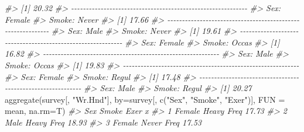 \documentclass[
]{book}
\newenvironment{Shaded}{\begin{snugshade}}{\end{snugshade}}
\newcommand{\AttributeTok}[1]{\textcolor[rgb]{0.77,0.63,0.00}{#1}}
\newcommand{\CommentTok}[1]{\textcolor[rgb]{0.56,0.35,0.01}{\textit{#1}}}
\newcommand{\FunctionTok}[1]{\textcolor[rgb]{0.00,0.00,0.00}{#1}}
\newcommand{\NormalTok}[1]{#1}
\newcommand{\StringTok}[1]{\textcolor[rgb]{0.31,0.60,0.02}{#1}}
\begin{document}
\begin{Shaded}
\begin{Highlighting}[]
\CommentTok{\#\textgreater{} [1] 20.32}
\CommentTok{\#\textgreater{} {-}{-}{-}{-}{-}{-}{-}{-}{-}{-}{-}{-}{-}{-}{-}{-}{-}{-}{-}{-}{-}{-}{-}{-}{-}{-}{-}{-}{-}{-}{-}{-}{-}{-}{-}{-}{-}{-}{-}{-}{-}{-}{-}{-}{-}{-}{-}{-}{-}{-}{-}{-}{-}{-}{-}{-}{-}{-}{-}{-} }
\CommentTok{\#\textgreater{} Sex: Female}
\CommentTok{\#\textgreater{} Smoke: Never}
\CommentTok{\#\textgreater{} [1] 17.66}
\CommentTok{\#\textgreater{} {-}{-}{-}{-}{-}{-}{-}{-}{-}{-}{-}{-}{-}{-}{-}{-}{-}{-}{-}{-}{-}{-}{-}{-}{-}{-}{-}{-}{-}{-}{-}{-}{-}{-}{-}{-}{-}{-}{-}{-}{-}{-}{-}{-}{-}{-}{-}{-}{-}{-}{-}{-}{-}{-}{-}{-}{-}{-}{-}{-} }
\CommentTok{\#\textgreater{} Sex: Male}
\CommentTok{\#\textgreater{} Smoke: Never}
\CommentTok{\#\textgreater{} [1] 19.61}
\CommentTok{\#\textgreater{} {-}{-}{-}{-}{-}{-}{-}{-}{-}{-}{-}{-}{-}{-}{-}{-}{-}{-}{-}{-}{-}{-}{-}{-}{-}{-}{-}{-}{-}{-}{-}{-}{-}{-}{-}{-}{-}{-}{-}{-}{-}{-}{-}{-}{-}{-}{-}{-}{-}{-}{-}{-}{-}{-}{-}{-}{-}{-}{-}{-} }
\CommentTok{\#\textgreater{} Sex: Female}
\CommentTok{\#\textgreater{} Smoke: Occas}
\CommentTok{\#\textgreater{} [1] 16.82}
\CommentTok{\#\textgreater{} {-}{-}{-}{-}{-}{-}{-}{-}{-}{-}{-}{-}{-}{-}{-}{-}{-}{-}{-}{-}{-}{-}{-}{-}{-}{-}{-}{-}{-}{-}{-}{-}{-}{-}{-}{-}{-}{-}{-}{-}{-}{-}{-}{-}{-}{-}{-}{-}{-}{-}{-}{-}{-}{-}{-}{-}{-}{-}{-}{-} }
\CommentTok{\#\textgreater{} Sex: Male}
\CommentTok{\#\textgreater{} Smoke: Occas}
\CommentTok{\#\textgreater{} [1] 19.83}
\CommentTok{\#\textgreater{} {-}{-}{-}{-}{-}{-}{-}{-}{-}{-}{-}{-}{-}{-}{-}{-}{-}{-}{-}{-}{-}{-}{-}{-}{-}{-}{-}{-}{-}{-}{-}{-}{-}{-}{-}{-}{-}{-}{-}{-}{-}{-}{-}{-}{-}{-}{-}{-}{-}{-}{-}{-}{-}{-}{-}{-}{-}{-}{-}{-} }
\CommentTok{\#\textgreater{} Sex: Female}
\CommentTok{\#\textgreater{} Smoke: Regul}
\CommentTok{\#\textgreater{} [1] 17.48}
\CommentTok{\#\textgreater{} {-}{-}{-}{-}{-}{-}{-}{-}{-}{-}{-}{-}{-}{-}{-}{-}{-}{-}{-}{-}{-}{-}{-}{-}{-}{-}{-}{-}{-}{-}{-}{-}{-}{-}{-}{-}{-}{-}{-}{-}{-}{-}{-}{-}{-}{-}{-}{-}{-}{-}{-}{-}{-}{-}{-}{-}{-}{-}{-}{-} }
\CommentTok{\#\textgreater{} Sex: Male}
\CommentTok{\#\textgreater{} Smoke: Regul}
\CommentTok{\#\textgreater{} [1] 20.27}
\FunctionTok{aggregate}\NormalTok{(survey[, }\StringTok{"Wr.Hnd"}\NormalTok{], }\AttributeTok{by=}\NormalTok{survey[, }\FunctionTok{c}\NormalTok{(}\StringTok{"Sex"}\NormalTok{, }\StringTok{"Smoke"}\NormalTok{, }\StringTok{"Exer"}\NormalTok{)], }\AttributeTok{FUN =}\NormalTok{ mean, }\AttributeTok{na.rm=}\NormalTok{T)}
\CommentTok{\#\textgreater{}       Sex Smoke Exer     x}
\CommentTok{\#\textgreater{} 1  Female Heavy Freq 17.73}
\CommentTok{\#\textgreater{} 2    Male Heavy Freq 18.93}
\CommentTok{\#\textgreater{} 3  Female Never Freq 17.53}

\end{Highlighting}
\end{Shaded}
\end{document}
